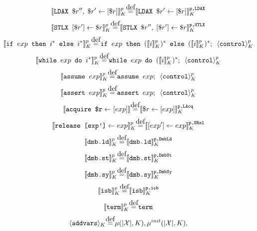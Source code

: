 \documentclass{article}
\newcommand{\var}{\texttt}
\newcommand\myeq{\stackrel{\mathclap{\normalfont\mbox{def}}}{=}}
\begin{document}
\vspace{-1.2em}
$$\llbracket \var{LDAX } \$r'', \;\$r' \leftarrow [\$r] \rrbracket_K^p \myeq \llbracket \var{LDAX } \$r' \leftarrow [\$r] \rrbracket_K^\texttt{p,LDAX}$$
\vspace{-1.2em}
$$\llbracket \var{STLX } [\$r'] \leftarrow \$r \rrbracket_K^p \myeq \llbracket \var{STLX } \$r'', \;[\$r'] \leftarrow \$r \rrbracket_K^\texttt{p,STLX}$$
\vspace{-1.2em}
$$\llbracket \texttt{if } exp \texttt{ then }i^* \texttt{ else }i^* \rrbracket_K^p \myeq \texttt{if } exp \texttt{ then } (\llbracket i  \rrbracket_K^p)^* \texttt{ else } (\llbracket i \rrbracket_K^p)^*; \kern 0.5em \langle \texttt{control} \rangle_K^p$$
\vspace{-1.2em}
$$\llbracket \texttt{while } exp \texttt{ do }i^* \rrbracket_K^p \myeq \texttt{while } exp \texttt{ do } (\llbracket i \rrbracket_K^p)^*; \kern 0.5em \langle \texttt{control} \rangle_K^p$$
\vspace{-1.2em}
$$\llbracket \texttt{assume } exp \rrbracket_K^p \myeq \texttt{assume } exp ; \kern 0.5em \langle \texttt{control} \rangle_K^p$$
\vspace{-1.2em}
$$\llbracket \texttt{assert } exp \rrbracket_K^p \myeq \texttt{assert } exp ; \kern 0.5em \langle \texttt{control} \rangle_K^p$$
\vspace{-1.2em}
$$\llbracket \texttt{acquire \$r} \leftarrow [exp] \rrbracket \myeq \llbracket \$r \leftarrow [exp] \rrbracket_K^\texttt{p,LAcq}$$
\vspace{-1.2em}
$$\llbracket \texttt{release [exp']} \leftarrow exp \rrbracket_K^p \myeq \llbracket [exp'] \leftarrow exp \rrbracket_K^\texttt{p,SRel}$$
\vspace{-1.2em}
$$\llbracket \texttt{dmb.ld} \rrbracket_K^p \myeq \llbracket \texttt{dmb.ld} \rrbracket_K^\texttt{p,DmbLd}$$
\vspace{-1.2em}
$$\llbracket \texttt{dmb.st} \rrbracket_K^p \myeq \llbracket \texttt{dmb.st} \rrbracket_K^\texttt{p,DmbSt}$$
\vspace{-1.2em}
$$\llbracket \texttt{dmb.sy} \rrbracket_K^p \myeq \llbracket \texttt{dmb.sy} \rrbracket_K^\texttt{p,DmbSy}$$
\vspace{-1.2em}
$$\llbracket \texttt{isb} \rrbracket_K^p \myeq \llbracket \texttt{isb} \rrbracket_K^\texttt{p,isb}$$
\vspace{-1.2em}
$$\llbracket\texttt{term}\rrbracket_K^p \myeq \texttt{term}$$
\vspace{-1.2em}
$$\langle \var{addvars} \rangle_K \myeq \mu(|\mathcal{X}|,K), \mu^{init}(|\mathcal{X}|,K), $$
\end{document}
